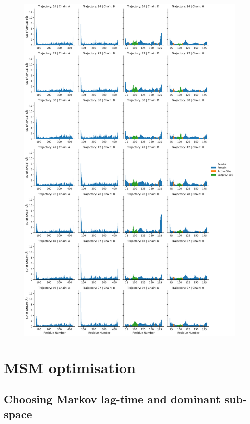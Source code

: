 \begin{figure}[p]
    \centering
    \includegraphics[height=0.9\textheight]{chapters/aadh/figures/sd_dev_by_residue.png}
    \label{fig:aadh_sd_dev_by_res}
\end{figure}


\section{MSM optimisation}
\subsection{Choosing Markov lag-time and dominant sub-space}

